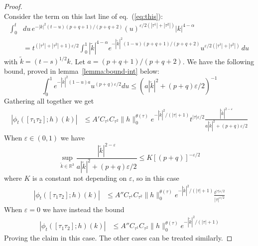 \documentclass[a4paper,12pt,reqno]{amsart}
\newcommand{\1}{{\bf 1}}
\newcommand{\eps}{\varepsilon}
\newcommand{\RR}{\mathbb{R}}
\begin{document}
\begin{proof}
$$$$
Consider the term on this last line of eq.~(\ref{eq:this}):
\begin{equation*}
  \begin{split}
 \int_0^t  & du\, e^{-|k|^2 (t-u) (p+q+1)/(p+q+2)}   
(u)^{\eps/2 (|\tau^1|+|\tau^2|)}
 |k|^{4-\alpha}
 \\ & = t^{(|\tau^1|+|\tau^2|+1)\eps/2}
          \int_0^1 |\tilde k|^{4-\alpha} e^{-|\tilde k|^2 (1-u) (p+q+1)/(p+q+2)}
u^{\eps/2 (|\tau^1|+|\tau^2|)}\, du
  \end{split}
\end{equation*}
with $\tilde k = (t-s)^{1/2} k$. Let $a = (p+q+1)/(p+q+2)$.
 We
have the following bound, proved in lemma~\ref{lemma:bound-int} below:
\begin{equation*}
\int_0^1 e^{-|\tilde k|^2 (1-u) a} u^{(p+q)\eps/2} du \le 
\left(a |\tilde k|^2   + (p+q)\eps/2\right)^{-1}
\end{equation*}
Gathering all together we get
\begin{equation*}
  \begin{split}
\left|\phi_{t}([\tau_1 \tau_2];h)(k)\right|
&    \le A' C_{\tau^1} C_{\tau^2} \|h\|_0^{\theta(\tau)}
e^{-|\tilde k|^2/(|\tau|+1)} t^{|\tau|\eps/2} \frac{|\tilde k|^{2-\eps}}{a |\tilde k|^2  + (p+q)\eps/2}
  \end{split}
\end{equation*}
When $\eps \in (0,1)$ we have
$$
\sup_{\tilde k \in \RR^3} \frac{|\tilde k|^{2-\eps}}{a |\tilde k|^2  + (p+q)\eps/2} \le K [(p+q)]^{-\eps/2}
$$
where $K$ is a constant not depending on $\eps$, so in this case
\begin{equation*}
  \begin{split}
\left|\phi_{t}([\tau_1 \tau_2];h)(k)\right|
&    \le A'' C_{\tau^1} C_{\tau^2} \|h\|_0^{\theta(\tau)}
e^{-|\tilde k|^2/(|\tau|+1)} \frac{t^{|\tau|\eps/2}}{|\tau|^{\eps/2}}
  \end{split}
\end{equation*}
When $\eps = 0$ we have instead the bound
\begin{equation*}
  \begin{split}
\left|\phi_{t}([\tau_1 \tau_2];h)(k)\right|
&    \le A'' C_{\tau^1} C_{\tau^2} \|h\|_0^{\theta(\tau)}
e^{-|\tilde k|^2/(|\tau|+1)}
  \end{split}
\end{equation*}
Proving the claim in this case. The other cases can be treated similarly.
\end{proof}
\end{document}
